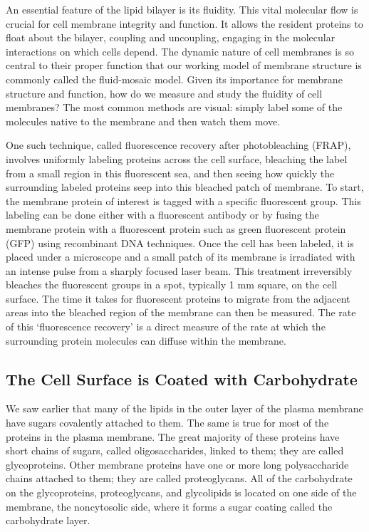 An essential feature of the lipid bilayer is its fluidity. This
vital molecular flow is crucial for cell membrane integrity and function.
It allows the resident proteins to float
about the bilayer, coupling and uncoupling, engaging in
the molecular interactions on which cells depend. The
dynamic nature of cell membranes is so central to their
proper function that our working model of membrane
structure is commonly called the fluid-mosaic model.
Given its importance for membrane structure and function,
how do we measure and study the fluidity of cell
membranes? The most common methods are visual:
simply label some of the molecules native to the membrane and then watch them move.

One such technique, called fluorescence recovery after
photobleaching (FRAP), involves uniformly labeling proteins
across the cell surface, bleaching the label from a
small region in this fluorescent sea, and then seeing how
quickly the surrounding labeled proteins seep into this
bleached patch of membrane. To start, the membrane
protein of interest is tagged with a specific fluorescent
group. This labeling can be done either with a fluorescent
antibody or by fusing the membrane protein with
a fluorescent protein such as green fluorescent protein
(GFP) using recombinant DNA techniques.
Once the cell has been labeled, it is placed under a
microscope and a small patch of its membrane is irradiated
with an intense pulse from a sharply focused laser
beam. This treatment irreversibly bleaches the fluorescent
groups in a spot, typically 1 mm square, on the cell surface.
The time it takes for fluorescent
proteins to migrate from the adjacent areas into the
bleached region of the membrane can then be measured. The rate of this ‘fluorescence recovery’ is a direct
measure of the rate at which the surrounding protein
molecules can diffuse within the membrane.

\subsection{The Cell Surface is Coated with Carbohydrate}

We saw earlier that many of the lipids in the outer layer of the plasma
membrane have sugars covalently attached to them. The same is true
for most of the proteins in the plasma membrane. The great majority of
these proteins have short chains of sugars, called oligosaccharides, linked
to them; they are called glycoproteins. Other membrane proteins have
one or more long polysaccharide chains attached to them; they are called
proteoglycans. All of the carbohydrate on the glycoproteins, proteoglycans,
and glycolipids is located on one side of the membrane, the noncytosolic
side, where it forms a sugar coating called the carbohydrate layer.

